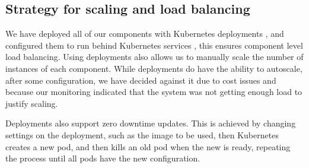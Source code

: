 \subsection{Strategy for scaling and load balancing}
We have deployed all of our components with Kubernetes deployments \cite{docs:kubernetes-deployment}, and configured them to run behind Kubernetes services \cite{docs:kubernetes-service}, this ensures component level load balancing.
Using deployments also allows us to manually scale the number of instances of each component. While deployments do have the ability to autoscale, after some configuration, we have decided against it due to cost issues and because our monitoring indicated that the system was not getting enough load to justify scaling.

Deployments also support zero downtime updates. This is achieved by changing settings on the deployment, such as the image to be used, then Kubernetes creates a new pod, and then kills an old pod when the new is ready, repeating the process until all pods have the new configuration.
